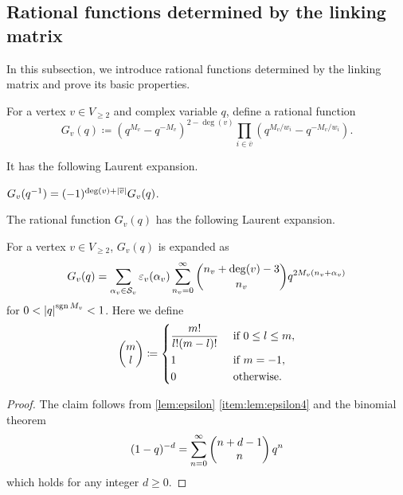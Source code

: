 \documentclass[11pt,a4paper,lualatex]{amsart}
\numberwithin{equation}{section} %
\begin{document}

\subsection{Rational functions determined by the linking matrix} \label{subsec:rat_func}


In this subsection, we introduce rational functions determined by the linking matrix and prove its basic properties.

For a vertex $ v \in V_{\ge 2} $ and complex variable $ q $, define a rational function
\[
G_v (q)	\coloneqq (q^{M_{v}} - q^{-M_{v}})^{2 - \deg(v)} \prod_{i \in \overline{v}} \left( q^{M_{v} / w_{i}} - q^{-M_{v} / w_{i}} \right).
\]

It has the following Laurent expansion.

\begin{rem} \label{rem:G_v_symmetry}
	$ G_v(q^{-1}) = (-1)^{\deg (v) + \left\lvert\overline{v}\right\rvert} G_v(q) $.
\end{rem}

The rational function $ G_v (q) $ has the following Laurent expansion.

\begin{lem} \label{lem:expansion_v}
	For a vertex $ v \in V_{\ge 2} $, $ G_{v} (q) $ is expanded as
	\[
	G_{v} (q)
	=
	\sum_{\alpha_{v} \in \mathcal{S}_{v}} \varepsilon_{v}(\alpha_{v}) \sum_{n_{v} = 0}^{\infty} \binom{n_{v} + \deg(v) - 3}{n_{v}} q^{2M_{v}(n_{v} + \alpha_{v})}
	\]
	for $ 0 < \left\lvert q\right\rvert^{\operatorname{sgn}{M_v}} < 1 $.
	Here we define
	\begin{equation} \label{eq:binomial}
		\pmat{m \\ l}
		\coloneqq
		\begin{dcases}
			\frac{m!}{l! (m-l)!} & \text{ if } 0 \le l \le m, \\
			1 & \text{ if } m=-1, \\
			0 & \text{ otherwise}.
		\end{dcases}
	\end{equation}
\end{lem}

\begin{proof}
	The claim follows from \cref{lem:epsilon} \cref{item:lem:epsilon4} and the binomial theorem
	\[
	(1-q)^{-d} = \sum_{n=0}^{\infty} \begin{pmatrix}n+d-1 \\n\end{pmatrix} q^n
	\]
	which holds for any integer $ d \ge 0 $.
\end{proof}
\end{document}
